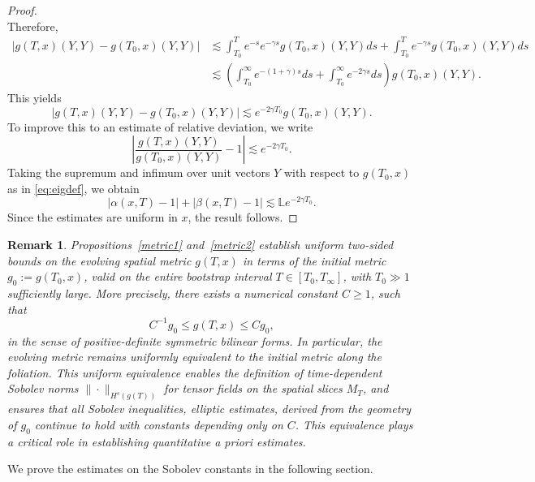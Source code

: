 \documentclass{amsart}
\newtheorem{remark}{Remark}
\begin{document}
\begin{proof}
\[\]
Therefore,
\begin{align}
|g(T,x)(Y,Y) - g(T_0,x)(Y,Y)| &\lesssim \int_{T_0}^T e^{-s} e^{-\gamma s} g(T_0,x)(Y,Y) ds + \int_{T_0}^T e^{-\gamma s} g(T_0,x)(Y,Y) ds \\
&\lesssim \left( \int_{T_0}^\infty e^{-(1+\gamma) s} ds + \int_{T_0}^\infty e^{-2\gamma s} ds \right) g(T_0,x)(Y,Y).
\end{align}
This yields
\[
|g(T,x)(Y,Y) - g(T_0,x)(Y,Y)| \lesssim e^{-2\gamma T_0} g(T_0,x)(Y,Y).
\]
To improve this to an estimate of relative deviation, we write
\[
\left| \frac{g(T,x)(Y,Y)}{g(T_0,x)(Y,Y)} - 1 \right| \lesssim e^{-2\gamma T_0}.
\]
Taking the supremum and infimum over unit vectors $Y$ with respect to $g(T_0,x)$ as in \eqref{eq:eigdef}, we obtain
\[
|\alpha(x,T) - 1| + |\beta(x,T) - 1| \lesssim \mathds{L} e^{-2\gamma T_0}.
\]
Since the estimates are uniform in $x$, the result follows.
\end{proof}

\begin{remark}
Propositions~\ref{metric1} and~\ref{metric2} establish uniform two-sided bounds on the evolving spatial metric $g(T,x)$ in terms of the initial metric $g_0 := g(T_0,x)$, valid on the entire bootstrap interval $T \in [T_0, T_{\infty}]$, with $T_0 \gg 1$ sufficiently large. More precisely, there exists a numerical constant $C \geq 1$, such that
\begin{equation}
    C^{-1} g_0 \leq g(T,x) \leq C g_0,
\end{equation}
in the sense of positive-definite symmetric bilinear forms. In particular, the evolving metric remains uniformly equivalent to the initial metric along the foliation. This uniform equivalence enables the definition of time-dependent Sobolev norms $\|\cdot\|_{H^s(g(T))}$ for tensor fields on the spatial slices $M_{T}$, and ensures that all Sobolev inequalities, elliptic estimates, derived from the geometry of $g_0$ continue to hold with constants depending only on $C$. This equivalence plays a critical role in establishing quantitative a priori estimates.
\end{remark}
\noindent We prove the estimates on the Sobolev constants in the following section.
\end{document}
